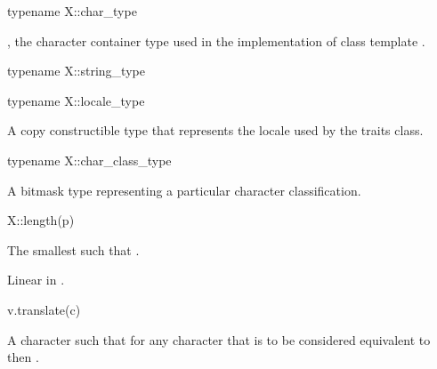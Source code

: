 \begin{itemdecl}
typename X::char_type
\end{itemdecl}

\begin{itemdescr}
\pnum
\result
{},
the character container type used in the implementation of class
template .
\end{itemdescr}

\begin{itemdecl}
typename X::string_type
\end{itemdecl}

\begin{itemdescr}
\pnum
\result
{}
\end{itemdescr}

\begin{itemdecl}
typename X::locale_type
\end{itemdecl}

\begin{itemdescr}
\pnum
\result
A copy constructible type
that represents the locale used by the traits class.
\end{itemdescr}

\begin{itemdecl}
typename X::char_class_type
\end{itemdecl}

\begin{itemdescr}
\pnum
\result
A bitmask type
representing a particular character classification.
\end{itemdescr}

\begin{itemdecl}
X::length(p)
\end{itemdecl}

\begin{itemdescr}
\pnum
\result
{}

\pnum
\returns
The smallest  such that .

\pnum
\complexity
Linear in .
\end{itemdescr}

\begin{itemdecl}
v.translate(c)
\end{itemdecl}

\begin{itemdescr}
\pnum
\result
{}

\pnum
\returns
A character such that for any character 
that is to be considered equivalent to 
then .
\end{itemdescr}

